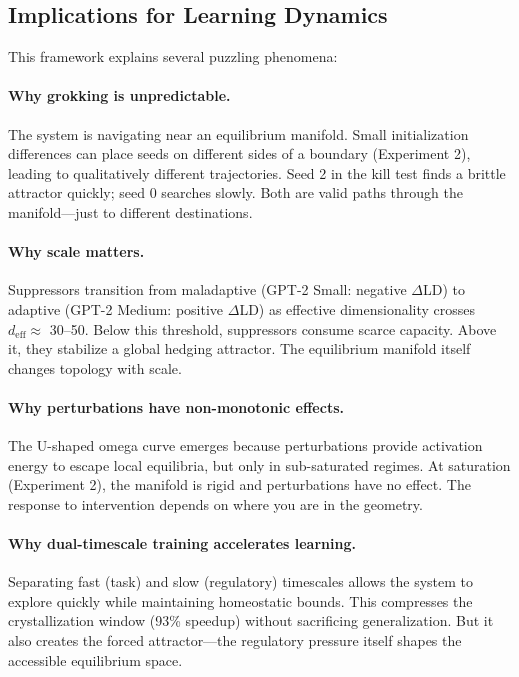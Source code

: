 \subsection{Implications for Learning Dynamics}

This framework explains several puzzling phenomena:

\paragraph{Why grokking is unpredictable.}
The system is navigating near an equilibrium manifold. Small initialization differences can place seeds on different sides of a boundary (Experiment 2), leading to qualitatively different trajectories. Seed 2 in the kill test finds a brittle attractor quickly; seed 0 searches slowly. Both are valid paths through the manifold—just to different destinations.

\paragraph{Why scale matters.}
Suppressors transition from maladaptive (GPT-2 Small: negative $\Delta$LD) to adaptive (GPT-2 Medium: positive $\Delta$LD) as effective dimensionality crosses $d_{\text{eff}} \approx$ 30--50. Below this threshold, suppressors consume scarce capacity. Above it, they stabilize a global hedging attractor. The equilibrium manifold itself changes topology with scale.

\paragraph{Why perturbations have non-monotonic effects.}
The U-shaped omega curve emerges because perturbations provide activation energy to escape local equilibria, but only in sub-saturated regimes. At saturation (Experiment 2), the manifold is rigid and perturbations have no effect. The response to intervention depends on where you are in the geometry.

\paragraph{Why dual-timescale training accelerates learning.}
Separating fast (task) and slow (regulatory) timescales allows the system to explore quickly while maintaining homeostatic bounds. This compresses the crystallization window (93\% speedup) without sacrificing generalization. But it also creates the forced attractor—the regulatory pressure itself shapes the accessible equilibrium space.
